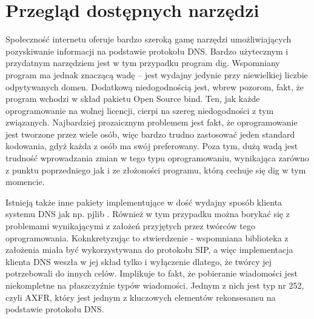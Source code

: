 \chapter{Przegląd dostępnych narzędzi}
Społeczność internetu oferuje bardzo szeroką gamę narzędzi umożliwiających pozyskiwanie informacji na podstawie protokołu DNS. Bardzo użytecznym i przydatnym narzędziem jest w tym przypadku program dig. Wspomniany program ma jednak znaczącą wadę -- jest wydajny jedynie przy niewielkiej liczbie odpytywanych domen. Dodatkową niedogodnością jest, wbrew pozorom, fakt, że program wchodzi w skład pakietu Open Source bind. Ten, jak każde oprogramowanie na wolnej licencji, cierpi na szereg niedogodności z tym związanych. Najbardziej prozaicznym problemem jest fakt, że oprogramowanie jest tworzone przez wiele osób, więc bardzo trudno zastosować jeden standard kodowania, gdyż każda z osób ma swój preferowany. Poza tym, dużą wadą jest trudność wprowadzania zmian w tego typu oprogramowaniu, wynikająca zarówno z punktu poprzedniego jak i ze złożoności programu, którą cechuje się dig w tym momencie.

Istnieją także inne pakiety implementujące w dość wydajny sposób klienta systemu DNS jak np. pjlib \cite{pjlib}. Również w tym przypadku można borykać się z problemami wynikającymi z założeń przyjętych przez twórców tego oprogramowania. Koknkretyzując to stwierdzenie - wspomniana biblioteka z założenia miała być wykorzystywana do protokołu SIP, a więc implementacja klienta DNS weszła w jej skład tylko i wyłączenie dlatego, że twórcy jej potrzebowali do innych celów. Implikuje to fakt, że pobieranie wiadomości jest niekompletne na płaszczyźnie typów wiadomości. Jednym z nich jest typ nr 252, czyli AXFR, który jest jednym z kluczowych elementów rekonsesansu na podstawie protokołu DNS.